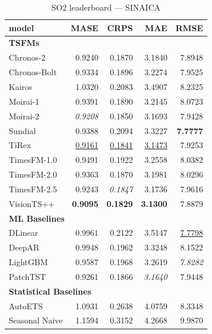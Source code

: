 \begin{table}[H]
\caption{SO2 leaderboard --- SINAICA}
\centering
\begin{small}
\begin{tabular}{lrrrr}
\toprule
model & MASE & CRPS & MAE & RMSE \\
\midrule
\multicolumn{5}{l}{\textbf{TSFMs}} \\
Chronos-2 & 0.9240 & 0.1870 & 3.1840 & 7.8948 \\
Chronos-Bolt & 0.9334 & 0.1896 & 3.2274 & 7.9525 \\
Kairos & 1.0320 & 0.2083 & 3.4907 & 8.2325 \\
Moirai-1 & 0.9391 & 0.1890 & 3.2145 & 8.0723 \\
Moirai-2 & \textit{0.9208} & 0.1850 & 3.1693 & 7.9428 \\
Sundial & 0.9388 & 0.2094 & 3.3227 & \textbf{7.7777} \\
TiRex & \underline{0.9161} & \underline{0.1841} & \underline{3.1473} & 7.9253 \\
TimesFM-1.0 & 0.9491 & 0.1922 & 3.2558 & 8.0382 \\
TimesFM-2.0 & 0.9363 & 0.1870 & 3.1981 & 8.0296 \\
TimesFM-2.5 & 0.9243 & \textit{0.1847} & 3.1736 & 7.9616 \\
VisionTS++ & \textbf{0.9095} & \textbf{0.1829} & \textbf{3.1300} & 7.8879 \\
\midrule
\multicolumn{5}{l}{\textbf{ML Baselines}} \\
DLinear & 0.9961 & 0.2122 & 3.5147 & \underline{7.7798} \\
DeepAR & 0.9948 & 0.1962 & 3.3248 & 8.1522 \\
LightGBM & 0.9587 & 0.1968 & 3.2619 & \textit{7.8282} \\
PatchTST & 0.9261 & 0.1866 & \textit{3.1640} & 7.9448 \\
\midrule
\multicolumn{5}{l}{\textbf{Statistical Baselines}} \\
AutoETS & 1.0931 & 0.2638 & 4.0759 & 8.3348 \\
Seasonal Naive & 1.1594 & 0.3152 & 4.2668 & 9.9870 \\
\bottomrule
\end{tabular}
\end{small}
\end{table}